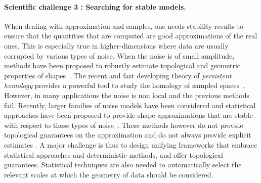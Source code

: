 





\paragraph{Scientific challenge 3 : Searching for stable models.} 
When dealing with approximation and samples, one needs stability results to ensure that the quantities that are computed are good approximations of the real ones. This is especially true in higher-dimensions where data are usually corrupted by various types of noise.  When the noise is of small amplitude, methods have been proposed to robustly estimate topological and geometric properties of shapes~\cite{geometrica-ccl09,nsw-tvu-2011}. 
 The recent and fast developing theory of {\em persistent homology} provides a powerful tool to study  the homology of sampled spaces~\cite{eh-ph-2008}.
However, in  many applications the noise is non local and the previous methods fail.
Recently,  larger families of noise models  have been considered and statistical approaches  have been proposed to provide shape approximations that are stable with respect to   those types of noise~\cite{gpvw-mme-2011}. These methods however do not provide topological guarantees on the approximation and do not always provide explicit estimates  . A major challenge is thus to design  unifying frameworks that embrace statistical approaches and deterministic methods, and offer topological guarantees.   Statistical techniques are also needed to automatically select the relevant scales at which the geometry of data should be considered. 


